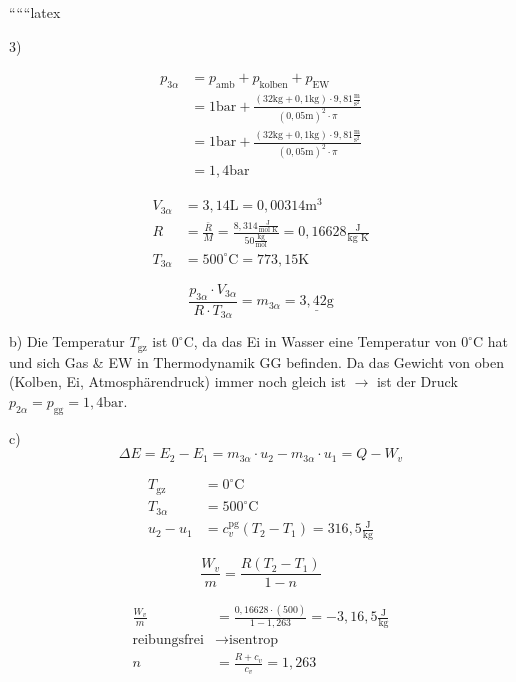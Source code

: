 
``````latex


3)

\begin{align*}
p_{3\alpha} &= p_{\text{amb}} + p_{\text{kolben}} + p_{\text{EW}} \\
&= 1 \text{bar} + \frac{(32 \text{kg} + 0,1 \text{kg}) \cdot 9,81 \frac{\text{m}}{\text{s}^2}}{(0,05 \text{m})^2 \cdot \pi} \\
&= 1 \text{bar} + \frac{(32 \text{kg} + 0,1 \text{kg}) \cdot 9,81 \frac{\text{m}}{\text{s}^2}}{(0,05 \text{m})^2 \cdot \pi} \\
&= 1,4 \text{bar}
\end{align*}

\begin{align*}
V_{3\alpha} &= 3,14 \text{L} = 0,00314 \text{m}^3 \\
R &= \frac{\bar{R}}{M} = \frac{8,314 \frac{\text{J}}{\text{mol K}}}{50 \frac{\text{kg}}{\text{mol}}} = 0,16628 \frac{\text{J}}{\text{kg K}} \\
T_{3\alpha} &= 500^\circ \text{C} = 773,15 \text{K}
\end{align*}

\[
\frac{p_{3\alpha} \cdot V_{3\alpha}}{R \cdot T_{3\alpha}} = m_{3\alpha} = \underline{3,42 \text{g}}
\]

b) Die Temperatur $T_{\text{gz}}$ ist $0^\circ \text{C}$, da das Ei in Wasser eine Temperatur von $0^\circ \text{C}$ hat und sich Gas \& EW in Thermodynamik GG befinden. Da das Gewicht von oben (Kolben, Ei, Atmosphärendruck) immer noch gleich ist $\rightarrow$ ist der Druck $p_{2\alpha} = p_{\text{gg}} = 1,4 \text{bar}$.

c) 
\[
\Delta E = E_2 - E_1 = m_{3\alpha} \cdot u_2 - m_{3\alpha} \cdot u_1 = Q - W_v
\]

\begin{align*}
T_{\text{gz}} &= 0^\circ \text{C} \\
T_{3\alpha} &= 500^\circ \text{C} \\
u_2 - u_1 &= c_v^{\text{pg}} (T_2 - T_1) = 316,5 \frac{\text{J}}{\text{kg}}
\end{align*}

\[
\frac{W_v}{m} = \frac{R(T_2 - T_1)}{1 - n}
\]

\begin{align*}
\frac{W_v}{m} &= \frac{0,16628 \cdot (500)}{1 - 1,263} = -3,16,5 \frac{\text{J}}{\text{kg}} \\
\text{reibungsfrei} &\rightarrow \text{isentrop} \\
n &= \frac{R + c_v}{c_v} = 1,263
\end{align*}

